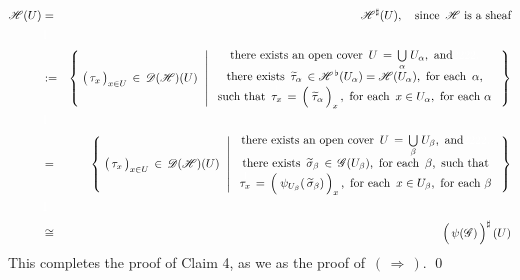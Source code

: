 \begin{eqnarray*}
\mathscr{H}(U)
& = &
	\mathscr{H}^{\sharp}(U),
	\quad
	\textnormal{since \,$\mathscr{H}$ is a sheaf}
\\ & {\color{white}\textnormal{\large$1$}} &
\\
& := &
	\left\{\;
		\left(\,\overset{{\color{white}.}}{\tau_{x}}\,\right)_{x \in U} \,\in\, \mathscr{D}(\mathscr{H})(U)
		\;\,\left\vert\;
			\begin{array}{c}
			\textnormal{there exists an open cover \,$U \,=\, \underset{\alpha}{\bigcup}\;U_{\alpha}$,\, and{\color{white}2222.}}
			\\
			\textnormal{there exists \,$\widetilde{\tau}_{\alpha} \,\in \mathscr{H}^{\,\flat}(U_{\alpha}) = \mathscr{H}(U_{\alpha})$,\, for each \,$\alpha$,}
			\\
			\textnormal{such that \,$\overset{{\color{white}\textnormal{\normalsize$1$}}}{\tau_{x}} \,=\, \left(\;\overset{{\color{white}.}}{\widetilde{\tau}_{\alpha}}\,\right)_{x}$\,,\, for each \,$x \in U_{\alpha}$,\, for each $\alpha$}
			\end{array}
			\right.
		\,\right\}
\\ & {\color{white}\textnormal{\large$1$}} &
\\
& = &
	\left\{\;
		\left(\,\overset{{\color{white}.}}{\tau_{x}}\,\right)_{x \in U} \,\in\, \mathscr{D}(\mathscr{H})(U)
		\;\,\left\vert\;
			\begin{array}{c}
			\textnormal{there exists an open cover \,$U \,=\, \underset{\beta}{\bigcup}\;U_{\beta}$,\, and{\color{white}2222.}}
			\\
			\textnormal{there exists \,$\widetilde{\sigma}_{\beta} \,\in\, \mathscr{G}(U_{\beta})$,\, for each \,$\beta$,\, such that}
			\\
			\textnormal{$\overset{{\color{white}\textnormal{\normalsize$1$}}}{\tau_{x}} \,=\, \left(\;\overset{{\color{white}.}}{\psi_{U_{\beta}}(\,\widetilde{\sigma}_{\beta})}\,\right)_{x}$\,,\, for each \,$x \in U_{\beta}$,\, for each $\beta$}
			\end{array}
			\right.
		\,\right\}
\\ & {\color{white}\textnormal{\large$1$}} &
\\
& \cong &
	\left(\,\overset{{\color{white}.}}{\psi(\mathscr{G})}\,\right)^{\sharp}(U)
\end{eqnarray*}
This completes the proof of Claim 4, as we as the proof of \,$(\,\Longrightarrow\,)$.
\qed


